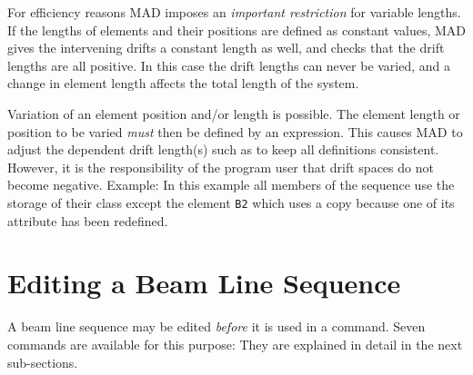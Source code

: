 For efficiency reasons MAD imposes an {\em important restriction}
for variable lengths.
If the lengths of elements and their positions are defined as constant values,
MAD gives the intervening drifts a constant length as well,
and checks that the drift lengths are all positive.
In this case the drift lengths can never be varied,
and a change in element length affects the total length of the system.
 
Variation of an element position and/or length is possible.
The element length or position to be varied {\em must} then
be defined by an expression.
This causes MAD to adjust the dependent drift length(s)
such as to keep all definitions consistent.
However, it is the responsibility of the program user that drift spaces
do not become negative.
Example:
In this example all members of the sequence use the storage of their
class except the element {\tt B2} which uses a copy because one of its
attribute has been redefined.
 
\section{Editing a Beam Line Sequence}
A beam line sequence  may be edited {\em before} it is
used in a  command.
Seven commands are available for this purpose:
They are explained in detail in the next sub-sections.
 
